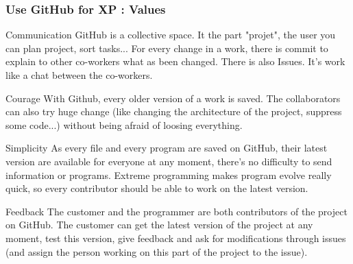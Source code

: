 \begin{frame}
    \frametitle{Use GitHub for XP : Values}
    \begin{block}{Communication}
        GitHub is a collective space. It the part "projet", the user you can plan project, sort tasks... For every change in a work, there is commit to explain to other co-workers what as been changed. There is also Issues. It's work like a chat between the co-workers.
    \end{block}\pause 
    \begin{block}{Courage} 
        With Github, every older version of a work is saved. The collaborators can also try huge change (like changing the architecture of the project, suppress some code...) without being afraid of loosing everything.
    \end{block}
\end{frame}
\begin{frame}
    \begin{block}{Simplicity} 
        As every file and every program are saved on GitHub, their latest version are available for everyone at any moment, there's no difficulty to send information or programs. Extreme programming makes program evolve really quick, so every contributor should be able to work on the latest version.
    \end{block}\pause
    \begin{block}{Feedback} 
        The customer and the programmer are both contributors of the project on GitHub. The customer can get the latest version of the project at any moment, test this version, give feedback and ask for modifications through issues (and assign the person working on this part of the project to the issue).
    \end{block}
\end{frame}
